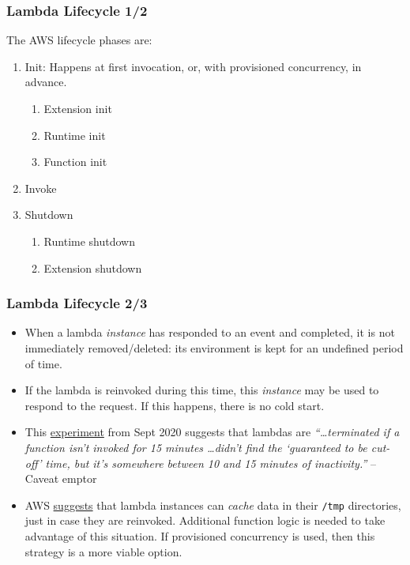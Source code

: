 \documentclass[11pt,aspectratio=169]{beamer}
\begin{document}
\begin{nrcanFrame}
  \frametitle{Lambda Lifecycle 1/2}
  The AWS lifecycle phases are:
  \begin{enumerate}
  \item Init: Happens at first invocation, or, with provisioned
    concurrency, in advance.
    \begin{enumerate}
    \item Extension init
    \item Runtime init
    \item Function init
    \end{enumerate}
  \item Invoke
  \item Shutdown 
    \begin{enumerate}
    \item Runtime shutdown
    \item Extension shutdown
    \end{enumerate}
  \end{enumerate}
\end{nrcanFrame}




\begin{nrcanFrame}
  \frametitle{Lambda Lifecycle 2/3}
  \begin{itemize}
    \item When a lambda \textit{instance} has responded to an event and completed, it is \alert{not immediately removed/deleted}:
  its environment is kept for an undefined period of time.
\item If the lambda is reinvoked during this time, this \textit{instance} may be used to respond to the request.
  \alert{If this happens, there is no cold start}.
\item This
  \href{https://xebia.com/blog/til-that-aws-lambda-terminates-instances-preemptively/}{experiment}
  from Sept 2020 suggests that lambdas are
  \textit{``\dots terminated
    if a  function isn’t invoked for 15 minutes \ldots didn’t find the
    ‘guaranteed to be cut-off’ time, but it’s somewhere between 10 and
    15 minutes of inactivity.''} -- Caveat emptor
\item 
  AWS
  \href{https://docs.aws.amazon.com/lambda/latest/dg/runtimes-context.html\#runtimes-lifecycle-shutdown}{suggests}
  that lambda instances can \textit{cache} data in their \texttt{/tmp} directories, just in case they are reinvoked.
  Additional function logic is needed to take advantage of this situation.
  If provisioned concurrency is used, then this strategy is a more
  viable option.
  \end{itemize}
\end{nrcanFrame}
\end{document}
